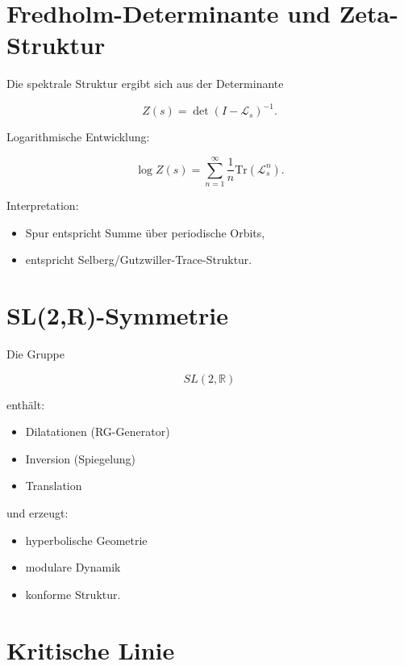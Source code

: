 \documentclass[a4paper,11pt]{article}
\begin{document}
	\section{Fredholm-Determinante und Zeta-Struktur}
	
	Die spektrale Struktur ergibt sich aus der Determinante
	
	\[
	Z(s)=\det(I-\mathcal{L}_s)^{-1}.
	\]
	
	Logarithmische Entwicklung:
	
	\[
	\log Z(s)=
	\sum_{n=1}^{\infty}
	\frac{1}{n}\mathrm{Tr}(\mathcal{L}_s^n).
	\]
	
	Interpretation:
	
	\begin{itemize}
		\item Spur entspricht Summe über periodische Orbits,
		\item entspricht Selberg/Gutzwiller-Trace-Struktur.
	\end{itemize}
	
	\section{SL(2,R)-Symmetrie}
	
	Die Gruppe
	
	\[
	SL(2,\mathbb{R})
	\]
	
	enthält:
	
	\begin{itemize}
		\item Dilatationen (RG-Generator)
		\item Inversion (Spiegelung)
		\item Translation
	\end{itemize}
	
	und erzeugt:
	
	\begin{itemize}
		\item hyperbolische Geometrie
		\item modulare Dynamik
		\item konforme Struktur.
	\end{itemize}
	
	\section{Kritische Linie}
	
\end{document}
